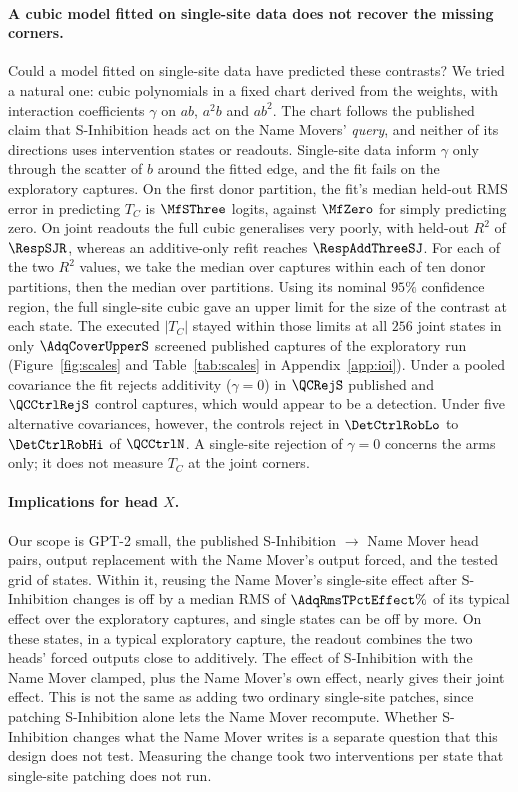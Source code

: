 \documentclass{article}
\theoremstyle{plain}
\theoremstyle{definition}
\begin{document}
\paragraph{A cubic model fitted on single-site data does not recover the missing corners.} Could a model fitted on single-site data
have predicted these contrasts? We tried a natural one: cubic polynomials in a fixed chart derived from the weights,
with interaction coefficients $\gamma$ on $ab$, $a^2b$ and $ab^2$. The chart follows the published claim that
S-Inhibition heads act on the Name Movers' \emph{query}, and neither of its directions uses intervention states or
readouts. Single-site data inform $\gamma$ only through the scatter of $b$ around the
fitted edge, and the fit fails on the exploratory captures. On the first donor partition, the fit's median held-out RMS error in
predicting $T_C$ is $\MfSThree$ logits, against $\MfZero$ for simply predicting zero. On joint readouts the full cubic generalises very poorly, with held-out $R^2$ of $\RespSJR$, whereas an
additive-only refit reaches $\RespAddThreeSJ$. For each of the two $R^2$ values, we take the median over captures
within each of ten donor partitions, then the median over partitions. Using its nominal $95\%$ confidence region, the full single-site cubic gave an upper limit for the size of the
contrast at each state. The executed $|T_C|$ stayed within those limits at all $256$ joint states in only
$\AdqCoverUpperS$ screened published captures of the exploratory run
(Figure~\ref{fig:scales} and Table~\ref{tab:scales} in Appendix~\ref{app:ioi}). Under a pooled covariance the fit rejects
additivity ($\gamma=0$) in $\QCRejS$ published and $\QCCtrlRejS$ control captures, which would appear to be a detection. Under five alternative covariances, however, the controls reject in $\DetCtrlRobLo$ to $\DetCtrlRobHi$ of
$\QCCtrlN$. A single-site rejection of $\gamma=0$ concerns the arms only; it does not measure $T_C$ at the joint corners.

\paragraph{Implications for head $X$.} Our scope is GPT-2 small, the published S-Inhibition $\to$ Name Mover head pairs,
output replacement with the Name Mover's output forced, and the tested grid of states. Within it, reusing the Name
Mover's single-site effect after S-Inhibition changes is off by a median RMS of $\AdqRmsTPctEffect\%$ of its typical
effect over the exploratory captures, and single states can be off by more. On these states, in a typical exploratory
capture, the readout combines the two heads' forced outputs close to additively. The effect of S-Inhibition with the Name Mover clamped, plus
the Name Mover's own effect, nearly gives their joint effect. This is not the same as adding two ordinary single-site
patches, since patching S-Inhibition alone lets the Name Mover recompute.
Whether S-Inhibition changes what the Name Mover writes is a separate question that this design does not test.
Measuring the change took two interventions per state that single-site patching does not run.
\end{document}
